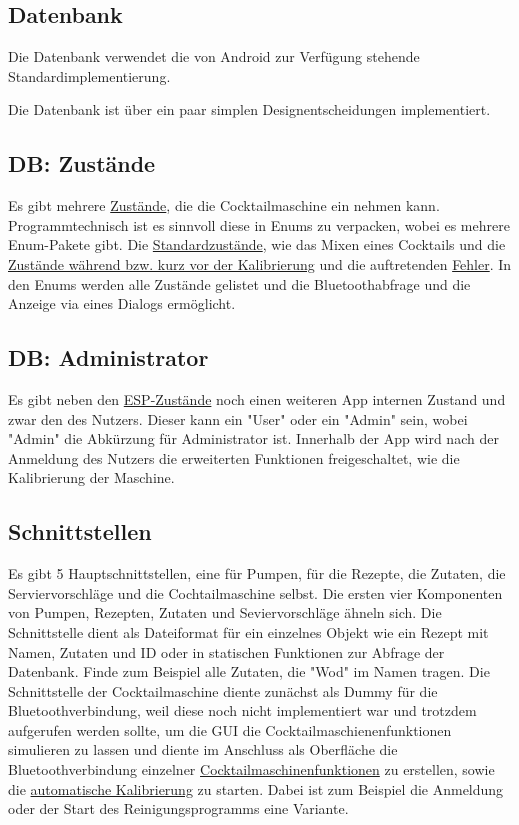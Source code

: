 \subsection{Datenbank}

Die Datenbank verwendet die von Android zur Verfügung stehende Standardimplementierung. 
 
Die Datenbank ist über ein paar simplen Designentscheidungen implementiert. 


\subsection{DB: Zustände}
\label{sec:dbstatus}

Es gibt mehrere \hyperref[sec:status]{Zustände}, die die Cocktailmaschine ein nehmen kann. Programmtechnisch ist es sinnvoll diese in Enums zu verpacken, wobei es mehrere Enum-Pakete gibt. Die \hyperref[sec:statusrez]{Standardzustände}, wie das Mixen eines Cocktails und die \hyperref[sec:statuscal]{Zustände während bzw. kurz vor der Kalibrierung} und die auftretenden \hyperref[sec:statuserror]{Fehler}. In den Enums werden alle Zustände gelistet und die Bluetoothabfrage und die Anzeige via eines Dialogs ermöglicht.

\subsection{DB: Administrator}

Es gibt neben den \hyperref[sec:dbstatus]{ESP-Zustände} noch einen weiteren App internen Zustand und zwar den des Nutzers. Dieser kann ein "User" oder ein "Admin" sein, wobei "Admin" die Abkürzung für Administrator ist. Innerhalb der App wird nach der Anmeldung des Nutzers die erweiterten Funktionen freigeschaltet, wie die Kalibrierung der Maschine. 

\subsection{Schnittstellen}

Es gibt 5 Hauptschnittstellen, eine für Pumpen, für die Rezepte, die Zutaten, die Serviervorschläge und die Cochtailmaschine selbst. 
Die ersten vier Komponenten von Pumpen, Rezepten, Zutaten und Seviervorschläge ähneln sich. Die Schnittstelle dient als Dateiformat für ein einzelnes Objekt wie ein Rezept mit Namen, Zutaten und ID oder in statischen Funktionen zur Abfrage der Datenbank. Finde zum Beispiel alle Zutaten, die "Wod" im Namen tragen. Die Schnittstelle der Cocktailmaschine diente zunächst als Dummy für die Bluetoothverbindung, weil diese noch nicht implementiert war und trotzdem aufgerufen werden sollte, um die GUI die Cocktailmaschienenfunktionen simulieren zu lassen und diente im Anschluss als Oberfläche die Bluetoothverbindung einzelner \hyperref[sec:espbefehle]{Cocktailmaschinenfunktionen} zu erstellen, sowie die \hyperref[sec:dioautokal]{automatische Kalibrierung} zu starten. Dabei ist zum Beispiel die Anmeldung oder der Start des Reinigungsprogramms eine Variante.
